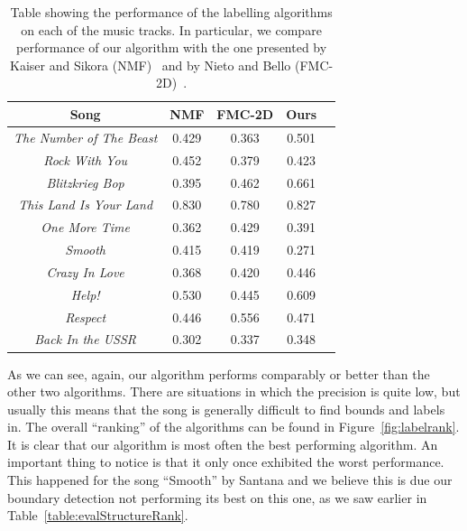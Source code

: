 \begin{table}
\begin{center}
\begin{tabular}{| c | c | c | c | c | } \hline 
Song  											& 	NMF				&  FMC-2D		&  Ours		\\ \hline \hline
\textit{The Number of The Beast} 	&	0.429			& 	0.363  			&  0.501	\\ \hline
\textit{Rock With You}						&	0.452			&  0.379			&  0.423	\\ \hline
\textit{Blitzkrieg Bop} 						&	0.395			&  0.462  			&  0.661 	\\ \hline
\textit{This Land Is Your Land} 		&	0.830			&  0.780			&  0.827 	\\ \hline
\textit{One More Time}					&	0.362			&  0.429    			&  0.391 	\\ \hline
\textit{Smooth}								&	0.415			&  0.419  			&  0.271 	\\ \hline
\textit{Crazy In Love}						&	0.368			&  0.420  			&  0.446  	\\ \hline
\textit{Help!}									&	0.530			&  0.445		   	&  0.609 	\\ \hline
\textit{Respect}								&	0.446			&  0.556  			&  0.471 	\\ \hline
\textit{Back In the USSR}				&	0.302			&  0.337 			&  0.348	\\ \hline

\end{tabular}
\caption{Table showing the performance of the labelling algorithms on each of the music tracks. In particular, we compare performance of our algorithm with the one presented by Kaiser and Sikora (NMF)~\cite{Sikora} and by Nieto and Bello (FMC-2D)~\cite{Bello}.}
\label{table:labellingnumeric}
\end{center}
\end{table}

As we can see, again, our algorithm performs comparably or better than the other two algorithms. There are situations in which the precision is quite low, but usually this means that the song is generally difficult to find bounds and labels in. The overall ``ranking'' of the algorithms can be found in Figure~\ref{fig:labelrank}. It is clear that our algorithm is most often the best performing algorithm. An important thing to notice is that it only once exhibited the worst performance. This happened for the song ``Smooth'' by Santana and we believe this is due our boundary detection not performing its best on this one, as we saw earlier in Table~\ref{table:evalStructureRank}.

